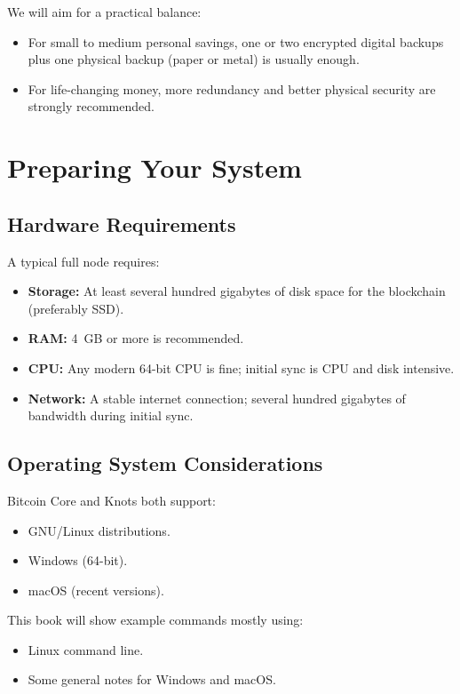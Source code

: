 \documentclass[12pt,a4paper]{book}
\begin{document}
We will aim for a practical balance:
\begin{itemize}
  \item For small to medium personal savings, one or two encrypted digital backups plus one physical backup (paper or metal) is usually enough.
  \item For life-changing money, more redundancy and better physical security are strongly recommended.
\end{itemize}

\chapter{Preparing Your System}

\section{Hardware Requirements}

A typical full node requires:

\begin{itemize}
  \item \textbf{Storage:} At least several hundred gigabytes of disk space for the blockchain (preferably SSD).
  \item \textbf{RAM:} 4~GB or more is recommended.
  \item \textbf{CPU:} Any modern 64-bit CPU is fine; initial sync is CPU and disk intensive.
  \item \textbf{Network:} A stable internet connection; several hundred gigabytes of bandwidth during initial sync.
\end{itemize}

\section{Operating System Considerations}

Bitcoin Core and Knots both support:

\begin{itemize}
  \item GNU/Linux distributions.
  \item Windows (64-bit).
  \item macOS (recent versions).
\end{itemize}

This book will show example commands mostly using:
\begin{itemize}
  \item Linux command line.
  \item Some general notes for Windows and macOS.
\end{itemize}
\end{document}

